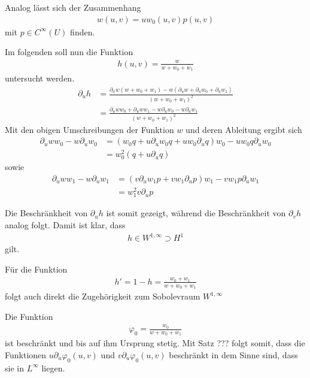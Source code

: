 \documentclass[10pt,a4paper,oneside]{report}
\begin{document}
Analog lässt sich der Zusammenhang
\begin{align*}
w\left(u,v\right) = u w_0\left(u,v\right) p\left(u,v\right)
\end{align*}
mit $p \in C^\infty\left(U\right)$ finden.

Im folgenden soll nun die Funktion
\begin{align*}
h\left(u,v\right) = \frac{w}{w + w_0 + w_1}
\end{align*}
untersucht werden.
\begin{align*}
\partial_u h &= \frac{\partial_u w \left(w+w_0+w_1\right) - w \left( \partial_u w + \partial_u w_0 +\partial_u w_1\right)}{\left(w+w_0+w_1\right)^2} \\
&= \frac{\partial_u w w_0+ \partial_u w w_1 - w \partial_u w_0 - w \partial_u w_1}{\left(w+w_0+w_1\right)^2}
\end{align*}
Mit den obigen Umschreibungen der Funktion $w$ und deren Ableitung ergibt sich
\begin{align*}
\partial_u w w_0 - w \partial_u w_0 &= \left(w_0 q + u \partial_u w_0 q +u w_0 \partial_u q \right) w_0 - u w_0 q \partial_u w_0 \\
&= w_0^2 \left(q+u\partial_u q\right)
\end{align*}
sowie 
\begin{align*}
\partial_u w w_1 - w \partial_u w_1 &= \left(v \partial_u w_1 p + v w_1 \partial_u p\right) w_1 - v w_1 p \partial_u w_1 \\
&= w_1^2 v \partial_u p
\end{align*}

Die Beschränkheit von $\partial_u h$ ist somit gezeigt, während die Beschränkheit von $\partial_v h$ analog folgt. 
Damit ist klar, dass
\begin{align*}
h \in W^{1, \infty} \supset H^1
\end{align*}
gilt.

Für die Funktion 
\begin{align*}
h' = 1 - h = \frac{w_0 + w_1}{w + w_0 +w_1}
\end{align*}
folgt auch direkt die Zugehörigkeit zum Sobolevraum $W^{1, \infty}$

Die Funktion 
\begin{align*}
\varphi_0 = \frac{w_0}{w + w_0 + w_1}
\end{align*}
ist beschränkt und bis auf ihm Ursprung stetig.
Mit Satz ??? folgt somit, dass die Funktionen $u \partial_u \varphi_0\left(u,v\right)$ und $v \partial_u \varphi_0\left(u,v\right)$ beschränkt in dem Sinne sind, dass sie in $L^{\infty}$ liegen.
\end{document}
